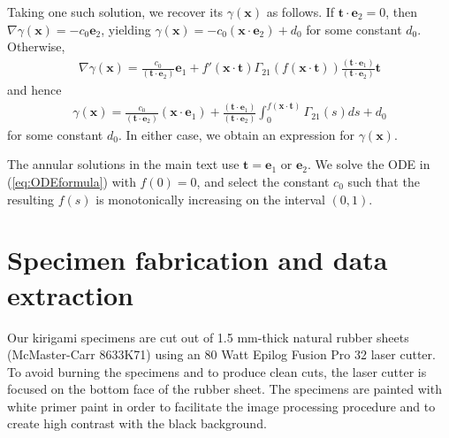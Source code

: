 \documentclass[aps,11pt,tightenlines,notitlepage,superscriptaddress,longbibliography,nofootinbib]{revtex4-1}
\begin{document}
Taking one such solution, we recover its $\gamma(\mathbf{x})$ as follows. If $\mathbf{t} \cdot \mathbf{e}_2 = 0$, then  $\nabla \gamma(\mathbf{x}) = -c_0 \mathbf{e}_2$, yielding $\gamma(\mathbf{x}) = - c_0 (\mathbf{x} \cdot \mathbf{e}_2)+ d_0$ for some constant $d_0$.  Otherwise,
\begin{equation}
\begin{aligned}
\nabla \gamma(\mathbf{x}) =  \frac{c_0}{(\mathbf{t} \cdot \mathbf{e}_2)} \mathbf{e}_1  + f'(\mathbf{x} \cdot \mathbf{t})  \Gamma_{21}(f(\mathbf{x} \cdot \mathbf{t})) \frac{(\mathbf{t} \cdot \mathbf{e}_1)}{(\mathbf{t} \cdot \mathbf{e}_2)} \mathbf{t}
\end{aligned}
\end{equation}
and hence
\begin{equation}
\begin{aligned}
\gamma(\mathbf{x}) = \frac{c_0}{(\mathbf{t} \cdot \mathbf{e}_2)} (\mathbf{x} \cdot \mathbf{e}_1) +  \frac{(\mathbf{t} \cdot \mathbf{e}_1)}{(\mathbf{t} \cdot \mathbf{e}_2)}  \int_0^{f(\mathbf{x} \cdot \mathbf{t})} \Gamma_{21}(s) ds  + d_0
\end{aligned}
\end{equation}
for some constant $d_0$.  In either case, we obtain an expression for $\gamma(\mathbf{x})$.  %

The annular solutions in the main text use $\mathbf{t} = \mathbf{e}_1$ or $\mathbf{e}_2$. We solve the ODE in (\ref{eq:ODEformula}) with $f(0) = 0$, and select the constant $c_0$ such that the resulting $f(s)$ is monotonically increasing on the interval $(0,1)$.

\section{Specimen fabrication and data extraction}
Our kirigami specimens are cut out of 1.5 mm-thick natural rubber sheets (McMaster-Carr 8633K71) using an 80 Watt Epilog Fusion Pro 32 laser cutter. To avoid burning the specimens and to produce clean cuts, the laser cutter is focused on the bottom face of the rubber sheet. The specimens are painted with white primer paint in order to facilitate the image processing procedure and to create high contrast with the black background.
\end{document}
